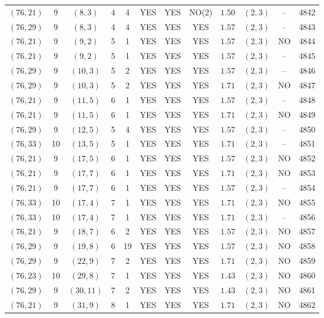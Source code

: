 \begin{longtable}{|c|c|c|c|c|c|c|c|c|c|c|c|}
$(76,21)$ & 9 & $(8,3)$ & 4 & 4 & YES & YES & NO(2) & $1.50$ & $(2,3)$ & -- & 4842\\
$(76,29)$ & 9 & $(8,3)$ & 4 & 4 & YES & YES & YES & $1.57$ & $(2,3)$ & -- & 4843\\
$(76,21)$ & 9 & $(9,2)$ & 5 & 1 & YES & YES & YES & $1.57$ & $(2,3)$ & NO & 4844\\
$(76,21)$ & 9 & $(9,2)$ & 5 & 1 & YES & YES & YES & $1.57$ & $(2,3)$ & -- & 4845\\
$(76,29)$ & 9 & $(10,3)$ & 5 & 2 & YES & YES & YES & $1.57$ & $(2,3)$ & -- & 4846\\
$(76,29)$ & 9 & $(10,3)$ & 5 & 2 & YES & YES & YES & $1.71$ & $(2,3)$ & NO & 4847\\
$(76,21)$ & 9 & $(11,5)$ & 6 & 1 & YES & YES & YES & $1.57$ & $(2,3)$ & -- & 4848\\
$(76,21)$ & 9 & $(11,5)$ & 6 & 1 & YES & YES & YES & $1.71$ & $(2,3)$ & NO & 4849\\
$(76,29)$ & 9 & $(12,5)$ & 5 & 4 & YES & YES & YES & $1.57$ & $(2,3)$ & -- & 4850\\
$(76,33)$ & 10 & $(13,5)$ & 5 & 1 & YES & YES & YES & $1.71$ & $(2,3)$ & -- & 4851\\
$(76,21)$ & 9 & $(17,5)$ & 6 & 1 & YES & YES & YES & $1.57$ & $(2,3)$ & NO & 4852\\
$(76,21)$ & 9 & $(17,7)$ & 6 & 1 & YES & YES & YES & $1.71$ & $(2,3)$ & NO & 4853\\
$(76,21)$ & 9 & $(17,7)$ & 6 & 1 & YES & YES & YES & $1.57$ & $(2,3)$ & -- & 4854\\
$(76,33)$ & 10 & $(17,4)$ & 7 & 1 & YES & YES & YES & $1.71$ & $(2,3)$ & NO & 4855\\
$(76,33)$ & 10 & $(17,4)$ & 7 & 1 & YES & YES & YES & $1.71$ & $(2,3)$ & -- & 4856\\
$(76,21)$ & 9 & $(18,7)$ & 6 & 2 & YES & YES & YES & $1.57$ & $(2,3)$ & NO & 4857\\
$(76,29)$ & 9 & $(19,8)$ & 6 & 19 & YES & YES & YES & $1.57$ & $(2,3)$ & NO & 4858\\
$(76,29)$ & 9 & $(22,9)$ & 7 & 2 & YES & YES & YES & $1.71$ & $(2,3)$ & NO & 4859\\
$(76,23)$ & 10 & $(29,8)$ & 7 & 1 & YES & YES & YES & $1.43$ & $(2,3)$ & NO & 4860\\
$(76,29)$ & 9 & $(30,11)$ & 7 & 2 & YES & YES & YES & $1.43$ & $(2,3)$ & NO & 4861\\
$(76,21)$ & 9 & $(31,9)$ & 8 & 1 & YES & YES & YES & $1.71$ & $(2,3)$ & NO & 4862\\

\end{longtable}
